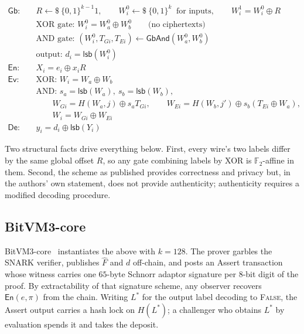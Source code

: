 \documentclass[11pt,a4paper]{article}
\theoremstyle{definition}
\theoremstyle{plain}
\newcommand{\Gb}{\mathsf{Gb}}
\newcommand{\En}{\mathsf{En}}
\newcommand{\Ev}{\mathsf{Ev}}
\newcommand{\De}{\mathsf{De}}
\newcommand{\lsbf}{\mathsf{lsb}}
\newcommand{\bit}{\{0,1\}}
\newcommand{\Hh}{H}
\begin{document}
\begin{align*}
\Gb:\quad & R \leftarrow\!\!\text{\$}\ \bit^{k-1}1, \qquad
            W_i^{0} \leftarrow\!\!\text{\$}\ \bit^{k}\ \text{ for inputs},\qquad
            W_i^{1} = W_i^{0} \oplus R \\
          & \text{XOR gate: } W_i^{0} = W_a^{0} \oplus W_b^{0}
            \qquad\text{(no ciphertexts)} \\
          & \text{AND gate: } (W_i^{0}, T_{Gi}, T_{Ei}) \leftarrow
            \textsf{GbAnd}(W_a^{0}, W_b^{0}) \\
          & \text{output: } d_i = \lsbf(W_i^{0}) \\[0.3em]
\En:\quad & X_i = e_i \oplus x_i R \\[0.3em]
\Ev:\quad & \text{XOR: } W_i = W_a \oplus W_b \\
          & \text{AND: } s_a = \lsbf(W_a),\ s_b = \lsbf(W_b), \\
          & \qquad W_{Gi} = \Hh(W_a, j) \oplus s_a T_{Gi}, \qquad
            W_{Ei} = \Hh(W_b, j') \oplus s_b (T_{Ei} \oplus W_a), \\
          & \qquad W_i = W_{Gi} \oplus W_{Ei} \\[0.3em]
\De:\quad & y_i = d_i \oplus \lsbf(Y_i)
\end{align*}

Two structural facts drive everything below. First, every wire's two labels
differ by the same global offset $R$, so any gate combining labels by XOR is
$\mathbb{F}_2$-affine in them. Second, the scheme as published provides
correctness and privacy but, in the authors' own statement, does not provide
authenticity; authenticity requires a modified decoding procedure.

\subsection{BitVM3-core}

BitVM3-core~\cite{BitVM3} instantiates the above with $k = 128$. The prover
garbles the SNARK verifier, publishes $\hat F$ and $d$ off-chain, and posts an
\textsf{Assert} transaction whose witness carries one $65$-byte Schnorr adaptor
signature per $8$-bit digit of the proof. By extractability of that signature
scheme, any observer recovers $\En(e,\pi)$ from the chain. Writing $L^{*}$ for
the output label decoding to \textsc{False}, the \textsf{Assert} output carries a
hash lock on $\Hh(L^{*})$; a challenger who obtains $L^{*}$ by evaluation spends
it and takes the deposit.
\end{document}

